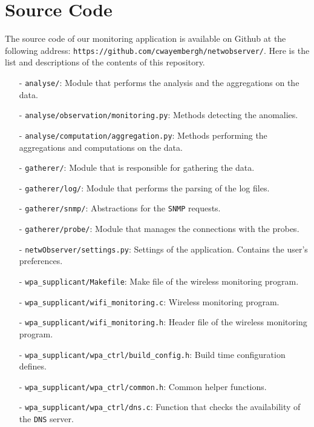 

\chapter{Source Code} %
\label{AppendixA} %

The source code of our monitoring application is available on Github at the following address: \texttt{https://github.com/cwayembergh/netwobserver/}.
Here is the list and descriptions of the contents of this repository.

\begin{itemize}
\item[-] \texttt{analyse/}: Module that performs the analysis and the aggregations on the data.
\item[-] \texttt{analyse/observation/monitoring.py}: Methods detecting the anomalies.
\item[-] \texttt{analyse/computation/aggregation.py}: Methods performing the aggregations and computations on the data.
\item[-] \texttt{gatherer/}: Module that is responsible for gathering the data.
\item[-] \texttt{gatherer/log/}: Module that performs the parsing of the log files.
\item[-] \texttt{gatherer/snmp/}: Abstractions for the \texttt{SNMP} requests.
\item[-] \texttt{gatherer/probe/}: Module that manages the connections with the probes.
\item[-] \texttt{netwObserver/settings.py}: Settings of the application. Contains the user's preferences.
\item[-] \texttt{wpa\_supplicant/Makefile}: Make file of the wireless monitoring program.
\item[-] \texttt{wpa\_supplicant/wifi\_monitoring.c}: Wireless monitoring program.
\item[-] \texttt{wpa\_supplicant/wifi\_monitoring.h}: Header file of the wireless monitoring program.
\item[-] \texttt{wpa\_supplicant/wpa\_ctrl/build\_config.h}: Build time configuration defines.
\item[-] \texttt{wpa\_supplicant/wpa\_ctrl/common.h}: Common helper functions.
\item[-] \texttt{wpa\_supplicant/wpa\_ctrl/dns.c}: Function that checks the availability of the \texttt{DNS} server.

\end{itemize}
